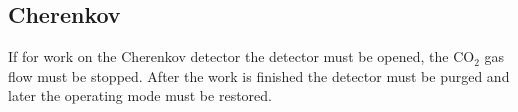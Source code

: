 \begin{safetyen}{0}{0}
\subsection{Cherenkov}

If for work on the Cherenkov detector the detector must be opened, 
the CO$_2$ gas flow must be stopped. After the work is finished the 
detector must be purged and later the operating mode must be restored.

\end{safetyen}



%
%
%
%
%
%
%
